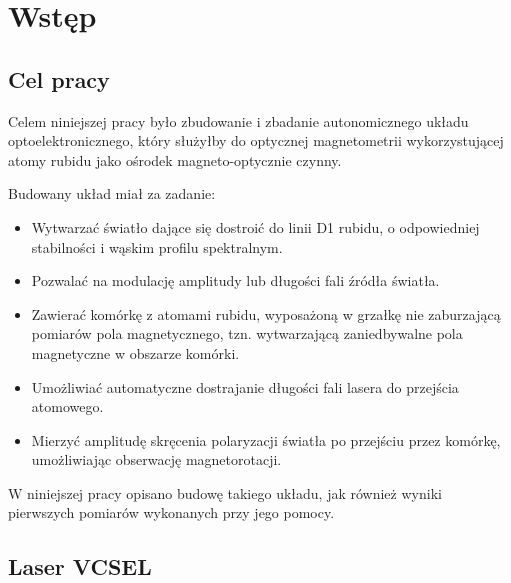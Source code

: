 \documentclass[a4paper,10pt,twoside]{report}
\begin{document}
\chapter{Wstęp}
\section{Cel pracy}

Celem niniejszej pracy było zbudowanie i zbadanie autonomicznego układu optoelektronicznego, który służyłby do optycznej magnetometrii wykorzystującej atomy rubidu jako ośrodek magneto-optycznie czynny.

Budowany układ miał za zadanie:
\begin{itemize}
 \item Wytwarzać światło dające się dostroić do linii D1 rubidu, o odpowiedniej stabilności i wąskim profilu spektralnym.
 \item Pozwalać na modulację amplitudy lub długości fali źródła światła.
 \item Zawierać komórkę z atomami rubidu, wyposażoną w grzałkę nie zaburzającą pomiarów pola magnetycznego, tzn. wytwarzającą zaniedbywalne pola magnetyczne w obszarze komórki.
 \item Umożliwiać automatyczne dostrajanie długości fali lasera do przejścia atomowego. 
 \item Mierzyć amplitudę skręcenia polaryzacji światła po przejściu przez komórkę, umożliwiając obserwację magnetorotacji.
\end{itemize}

W niniejszej pracy opisano budowę takiego układu, jak również wyniki pierwszych pomiarów wykonanych przy jego pomocy.


\section{Laser VCSEL}
\end{document}
